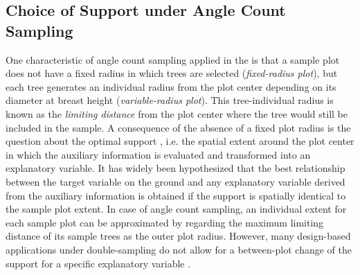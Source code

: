 \subsection{Choice of Support under Angle Count Sampling}
\label{sec:supp}

One characteristic of angle count sampling applied in the \bwi{} is that a sample plot does not have a fixed radius in which trees are selected (\textit{fixed-radius plot}), but each tree generates an individual radius from the plot center depending on its diameter at breast height (\textit{variable-radius plot}). This tree-individual radius is known as the \textit{limiting distance} from the plot center where the tree would still be included in the sample. A consequence of the absence of a fixed plot radius is the question about the optimal support \citep{hollaus2007}, i.e. the spatial extent around the plot center in which the auxiliary information is evaluated and transformed into an explanatory variable. It has widely been hypothesized that the best relationship between the target variable on the ground and any explanatory variable derived from the auxiliary information is obtained if the support is spatially identical to the sample plot extent. In case of angle count sampling, an individual extent for each sample plot can be approximated by regarding the maximum limiting distance of its sample trees as the outer plot radius. However, many design-based applications under double-sampling do not allow for a between-plot change of the support for a specific explanatory variable \citep{mandallaz2013c, mandallaz2013a}.\par
